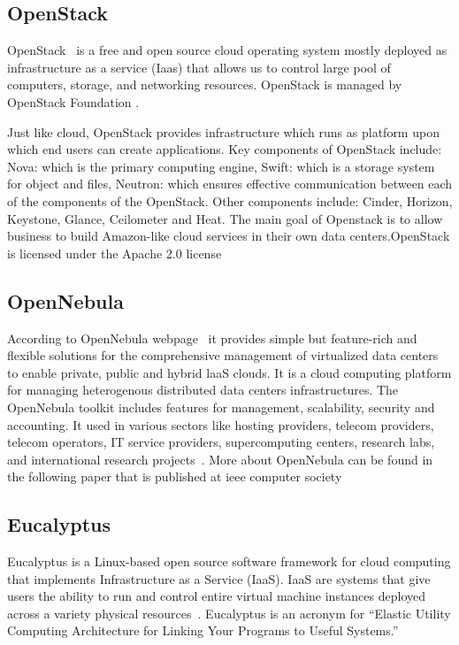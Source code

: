 {\subsection{OpenStack \cv}
 
OpenStack~\cite{www-OpenStack.org} is a free and open source cloud
operating system mostly deployed as infrastructure as a service (Iaas)
that allows us to control large pool of computers, storage, and
networking resources.  OpenStack is managed by OpenStack Foundation
\cite{www-OpenStack-Found}.
     
Just like cloud, OpenStack provides infrastructure which runs as
platform upon which end users can create applications. Key components
of OpenStack include: Nova: which is the primary computing engine,
Swift: which is a storage system for object and files, Neutron: which
ensures effective communication between each of the components of the
OpenStack. Other components include: Cinder, Horizon, Keystone,
Glance, Ceilometer and Heat. The main goal of Openstack is to allow
business to build Amazon-like cloud services in their own data
centers.OpenStack is licensed under the Apache 2.0 license
\cite{www-apache-license}
	
\subsection{OpenNebula \cv}

According to OpenNebula webpage~\cite{www-opennebula-org} it provides
simple but feature-rich and flexible solutions for the comprehensive
management of virtualized data centers to enable private, public and
hybrid laaS clouds. It is a cloud computing platform for managing
heterogenous distributed data centers infrastructures. The OpenNebula
toolkit includes features for management, scalability, security and
accounting. It used in various sectors like hosting providers, telecom
providers, telecom operators, IT service providers, supercomputing
centers, research labs, and international research
projects~\cite{www-opennebula-wiki}. More about OpenNebula can be
found in the following paper that is published at ieee computer
society~\cite{paper-opennebula}
     
\subsection{Eucalyptus}

Eucalyptus is a Linux-based open source software framework for cloud
computing that implements Infrastructure as a Service (IaaS). IaaS are
systems that give users the ability to run and control entire virtual
machine instances deployed across a variety physical
resources~\cite{paper-eucalyptus}. Eucalyptus is an acronym for
``Elastic Utility Computing Architecture for Linking Your Programs to
Useful Systems.''

}
